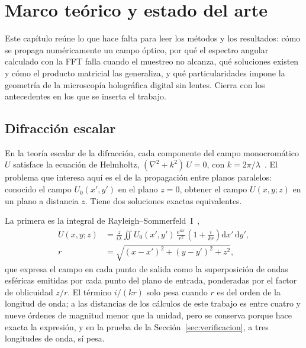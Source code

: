 \chapter{Marco teórico y estado del arte}
\label{cap:marco}

Este capítulo reúne lo que hace falta para leer los métodos y los
resultados: cómo se propaga numéricamente un campo óptico, por qué el
espectro angular calculado con la FFT falla cuando el muestreo no alcanza, qué
soluciones existen y cómo el producto matricial las generaliza, y qué
particularidades impone la geometría de la microscopía holográfica digital sin
lentes. Cierra con los antecedentes en los que se inserta el trabajo.

\section{Difracción escalar}
\label{sec:difraccion}

En la teoría escalar de la difracción, cada componente del campo
monocromático $U$ satisface la ecuación de Helmholtz,
$(\nabla^2 + k^2)\,U = 0$, con $k = 2\pi/\lambda$~\cite{goodman2005}. El
problema que interesa aquí es el de la propagación entre planos paralelos:
conocido el campo $U_0(x', y')$ en el plano $z = 0$, obtener el campo
$U(x, y; z)$ en un plano a distancia $z$. Tiene dos soluciones exactas
equivalentes.

La primera es la integral de Rayleigh--Sommerfeld~I~\cite{goodman2005},
\begin{equation}
  \begin{split}
  U(x, y; z) &= \frac{z}{i\lambda} \iint U_0(x', y')\,
  \frac{e^{ikr}}{r^2}\left(1 + \frac{i}{kr}\right) \mathrm{d}x'\,\mathrm{d}y',\\
  r &= \sqrt{(x - x')^2 + (y - y')^2 + z^2},
  \end{split}
  \label{eq:rs-goodman}
\end{equation}
que expresa el campo en cada punto de salida como la superposición de ondas
esféricas emitidas por cada punto del plano de entrada, ponderadas por el
factor de oblicuidad $z/r$. El término $i/(kr)$ solo pesa cuando $r$ es del
orden de la longitud de onda; a las distancias de los cálculos de este trabajo
es entre cuatro y nueve órdenes de magnitud menor que la unidad, pero se
conserva porque hace exacta la expresión, y en la prueba de la
Sección~\ref{sec:verificacion}, a tres longitudes de onda, sí pesa.

